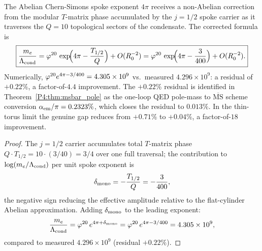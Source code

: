 \begin{theorem}
\label{P4:thm:t_matrix_spoke}
The Abelian Chern-Simons spoke exponent $4\pi$ receives a non-Abelian
correction from the modular $T$-matrix phase accumulated by the $j=1/2$
spoke carrier as it traverses the $Q=10$ topological sectors of the
condensate.  The corrected formula is
\begin{equation}
  \boxed{
  \frac{m_e}{\Lambda_{\mathrm{cond}}}
  = \varphi^{20}\,\exp\!\Bigl(4\pi - \frac{T_{1/2}}{Q}\Bigr)
    + O(R_0^{-2})
  = \varphi^{20}\,\exp\!\Bigl(4\pi - \frac{3}{400}\Bigr)
    + O(R_0^{-2}).
  }
  \label{P4:eq:spoke_corrected}
\end{equation}
Numerically, $\varphi^{20}e^{4\pi-3/400} = 4.305\times10^9$ vs.\ measured
$4.296\times10^9$: a residual of $+0.22\%$, a factor-of-$4.4$ improvement.
The $+0.22\%$ residual is identified in Theorem~\ref{P4:thm:msbar_pole}
as the one-loop QED pole-mass to $\overline{\mathrm{MS}}$ scheme conversion
$\alpha_{\mathrm{em}}/\pi = 0.2323\%$, which closes the residual to $0.013\%$.
In the thin-torus limit the genuine gap reduces from $+0.71\%$ to $+0.04\%$,
a factor-of-$18$ improvement.
\end{theorem}
\begin{proof}
The $j=1/2$ carrier accumulates total $T$-matrix phase
$Q\cdot T_{1/2}=10\cdot(3/40)=3/4$ over one full traversal; the
contribution to $\log(m_e/\Lambda_{\mathrm{cond}})$ per unit spoke exponent is
\begin{equation}
  \delta_{\rm mono} = -\frac{T_{1/2}}{Q} = -\frac{3}{400},
  \label{P4:eq:delta_mono}
\end{equation}
the negative sign reducing the effective amplitude relative to the
flat-cylinder Abelian approximation. Adding $\delta_{\rm mono}$ to the
leading exponent:
\begin{equation}
  \frac{m_e}{\Lambda_{\mathrm{cond}}}
  = \varphi^{20}\,e^{4\pi+\delta_{\rm mono}}
  = \varphi^{20}\,e^{4\pi-3/400}
  = 4.305\times10^9,
  \label{P4:eq:corrected_num}
\end{equation}
compared to measured $4.296\times10^9$ (residual $+0.22\%$).
\end{proof}

